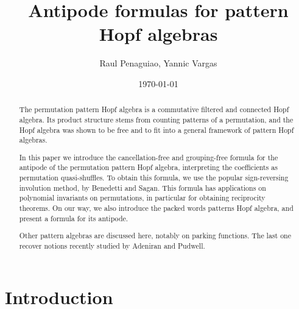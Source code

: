 \documentclass[12pt, reqno]{amsart}
\theoremstyle{definition}
\begin{document}
\title{Antipode formulas for pattern Hopf algebras} %



\author{Raul Penaguiao, Yannic Vargas}
\address{San Francisco State University}
\address{Weierstrass Institute for Applied Analysis and Stochastics}
\date{\today} %

\begin{abstract}
The permutation pattern Hopf algebra is a commutative filtered and connected Hopf algebra.
Its product structure stems from counting patterns of a permutation, and the Hopf algebra was shown to be free and to fit into a general framework of pattern Hopf algebras.

In this paper we introduce the cancellation-free and grouping-free formula for the antipode of the permutation pattern Hopf algebra, interpreting the coefficients as permutation quasi-shuffles.
To obtain this formula, we use the popular sign-reversing involution method, by Benedetti and Sagan.
This formula has applications on polynomial invariants on permutations, in particular for obtaining reciprocity theorems.
On our way, we also introduce the packed words patterns Hopf algebra, and present a formula for its antipode.

Other pattern algebras are discussed here, notably on parking functions.
The last one recover notions recently studied by Adeniran and Pudwell.
\end{abstract}


\maketitle

\tableofcontents

\section{Introduction}
\end{document}
